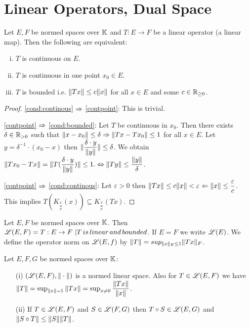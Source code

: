 \section{Linear Operators, Dual Space}

\begin{lemma}
	Let $E,F$ be normed spaces over $\mathbb{K}$ and $T: E \rightarrow F$ be a linear operator (a linear map). Then the following are 			equivalent: \label{bounded_continous}

	\begin{enumerate}[(i)]
		\item $T$ is continuous on $E$.\label{cond:continous}
		\item $T$ is continuous in one point $x_0 \in E$. \label{contpoint}
		\item $T$ is bounded i.e. $\Vert Tx \Vert \le c\Vert x \Vert$ for all $x \in E$ and some $c \in \mathbb{R}_{\ge 0}$. \label{cond:bounded}
	\end{enumerate}
\end{lemma}

\begin{proof}
	\eqref{cond:continous} $\Rightarrow$ \eqref{contpoint}: This is trivial.
	
	\eqref{contpoint} $\Rightarrow$ \eqref{cond:bounded}: Let $T$ be continuous in $x_0$. Then there exists $\delta \in \mathbb{R}_{> 0}$ such that $\Vert x - x_0 \Vert \le \delta \Rightarrow \Vert Tx - Tx_0 \Vert \le 1$ for all $x \in E$. Let $y = \delta^{-1}\cdot(x_0 - x)$ then $\Vert \dfrac{\delta \cdot y}{\Vert y \Vert} \Vert \le \delta$. We obtain $\Vert Tx_0 - Tx \Vert = \Vert T(\dfrac{\delta \cdot y}{\Vert y \Vert}) \Vert \le 1. \Leftrightarrow \Vert Ty \Vert \le \dfrac{\Vert y \Vert}{\delta}$.
	
	\eqref{contpoint} $\Rightarrow$ \eqref{cond:continous}:  Let $\varepsilon > 0$ then $\Vert Tx \Vert \le c \Vert x \Vert < \varepsilon \Leftarrow \Vert x \Vert \le \dfrac{\varepsilon}{c}$. This implies $T(K_{\dfrac{\varepsilon}{c}}(x)) \subseteq K_{\dfrac{\varepsilon}{c}}(Tx)$.

\end{proof}

\begin{definition}
Let $E,F$ be normed spaces over $\mathbb{K}$. Then $\mathscr{L}(E,F) = {T:E \rightarrow F \ | T\,is \,linear\,and\,bounded}$. If $E = F$ we write $\mathscr{L}(E)$. We define the operator norm on $\mathscr{L}(E,f)$ by $\Vert T \Vert=sup_{\Vert x \Vert_{E} \le 1} \Vert Tx \Vert_{F}$.
\end{definition}

\begin{lemma}
Let $E,F,G$ be normed spaces over $\mathbb{K}$:
\begin{enumerate}
	\item[(i)] $(\mathscr{L}(E,F), \Vert \cdot \Vert)$ is a normed linear space. Also for $T \in \mathscr{L}(E,F)$ we have $\Vert T \Vert= \sup_{\Vert x \Vert=1} \Vert Tx \Vert = \sup_{x \neq 0} \dfrac{\Vert Tx \Vert}{\Vert x \Vert}$.
	\item[(ii)] If $T \in \mathscr{L}(E,F)$ and $S \in \mathscr{L}(F,G)$ then $T \circ S \in \mathscr{L}(E,G)$ and $\Vert S \circ T \Vert \le \Vert S \Vert \Vert T \Vert$.
\end{enumerate}
\end{lemma}

